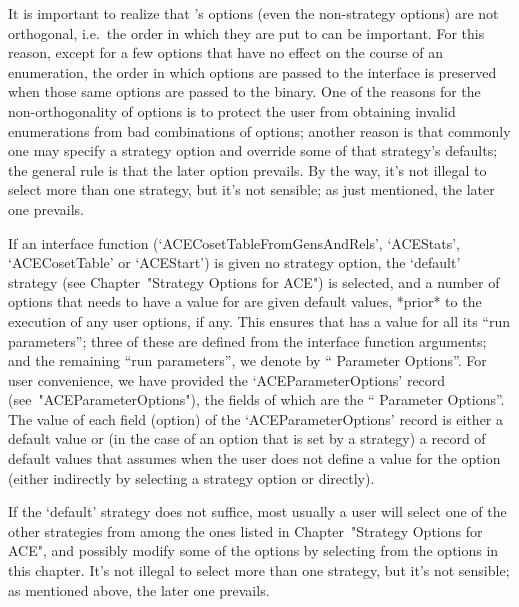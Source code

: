 It  is  important  to  realize  that  {\ACE}'s   options   (even   the
non-strategy options) are not orthogonal, i.e.\  the  order  in  which
they are put to {\ACE} can be important. For this reason, except for a
few options that have no effect on the course of an  enumeration,  the
order in which options are passed to the {\ACE} interface is preserved
when those same options are passed to the {\ACE} binary.  One  of  the
reasons for the non-orthogonality of options is to  protect  the  user
from obtaining invalid enumerations from bad combinations of  options;
another reason is that commonly one may specify a strategy option  and
override some of that strategy's defaults; the general  rule  is  that
the later option prevails. By the way, it's not illegal to select more
than one strategy, but it's not sensible; as just mentioned, the later
one prevails.


If  an  {\ACE}  interface  function   (`ACECosetTableFromGensAndRels',
`ACEStats',  `ACECosetTable'  or  `ACEStart')  is  given  no  strategy
option, the `default'  strategy  (see  Chapter~"Strategy  Options  for
ACE") is selected, and a number of options that {\ACE} needs to have a
value for are given default values, *prior* to the  execution  of  any
user options, if any. This ensures that {\ACE} has a value for all its
``run parameters'';  three  of  these  are  defined  from  the  {\ACE}
interface function arguments; and the remaining ``run parameters'', we
denote by ``{\ACE} Parameter Options''. For user convenience, we  have
provided the `ACEParameterOptions' record (see~"ACEParameterOptions"),
the fields of which are the ``{\ACE} Parameter Options''. The value of
each field (option) of the `ACEParameterOptions' record  is  either  a
default value or (in the case of an option that is set by a  strategy)
a record of default values that {\ACE} assumes when the user does  not
define a value for  the  option  (either  indirectly  by  selecting  a
strategy option or directly).

If the `default' strategy does not suffice, most usually a  user  will
select one of the other strategies  from  among  the  ones  listed  in
Chapter~"Strategy Options for ACE", and possibly modify  some  of  the
options by selecting from  the  options  in  this  chapter.  It's  not
illegal to select more than one strategy, but it's  not  sensible;  as
mentioned above, the later one prevails.

